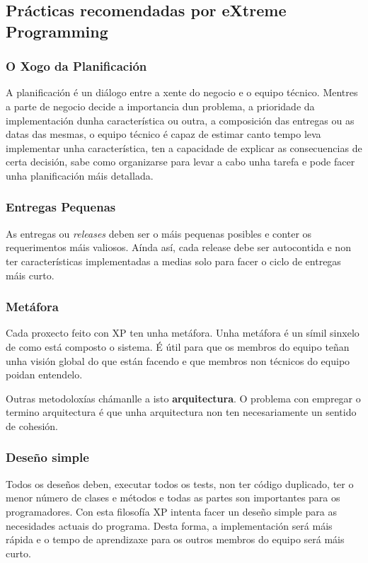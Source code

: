 \subsection{Prácticas recomendadas por eXtreme Programming}

\subsubsection{O Xogo da Planificación}
A planificación é un diálogo entre a xente do negocio e o equipo técnico. Mentres a parte de negocio decide a importancia dun problema, a prioridade da implementación dunha característica ou outra, a composición das entregas ou as datas das mesmas, o equipo técnico é capaz de estimar canto tempo leva implementar unha característica, ten a capacidade de explicar as consecuencias de certa decisión, sabe como organizarse para levar a cabo unha tarefa e pode facer unha planificación máis detallada.

\subsubsection{Entregas Pequenas}
As entregas ou \emph{releases} deben ser o máis pequenas posibles e conter os requerimentos máis valiosos. Aínda así, cada release debe ser autocontida e non ter características implementadas a medias solo para facer o ciclo de entregas máis curto.

\subsubsection{Metáfora}
Cada proxecto feito con XP ten unha metáfora. Unha metáfora é un símil sinxelo de como está composto o sistema. É útil para que os membros do equipo teñan unha visión global do que están facendo e que membros non técnicos do equipo poidan entendelo.

Outras metodoloxías chámanlle a isto \textbf{arquitectura}. O problema con empregar o termino arquitectura é que unha arquitectura non ten necesariamente un sentido de cohesión.

\subsubsection{Deseño simple}
Todos os deseños deben, executar todos os tests, non ter código duplicado, ter o menor número de clases e métodos e todas as partes son importantes para os programadores. Con esta filosofía XP intenta facer un deseño simple para as necesidades actuais do programa. Desta forma, a implementación será máis rápida e o tempo de aprendizaxe para os outros membros do equipo será máis curto.

